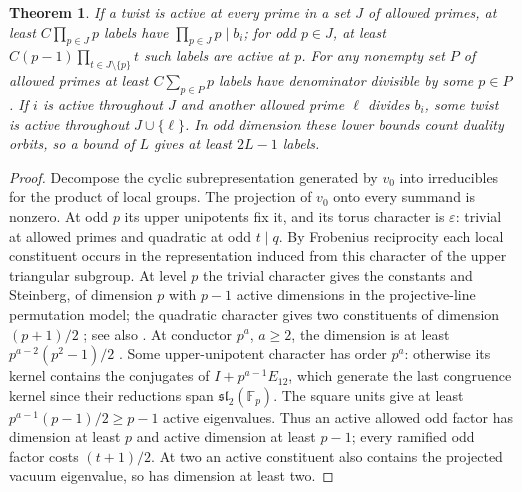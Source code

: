 \documentclass[11pt]{amsart}
\numberwithin{equation}{section}
\newtheorem{theorem}{Theorem}[section]
\theoremstyle{definition}
\theoremstyle{plain}
\begin{document}
\begin{theorem}\label{thm:spherical}
If a twist is active at every prime in a set $J$ of allowed primes,
at least $C\prod_{p\in J}p$ labels have $\prod_{p\in J}p\mid b_i$;
for odd $p\in J$, at least $C(p-1)\prod_{t\in J\setminus\{p\}}t$
such labels are active at $p$.
For any nonempty set $P$ of allowed primes at least $C\sum_{p\in P}p$
labels have denominator divisible by some $p\in P$. If $i$ is active
throughout $J$ and another allowed prime $\ell$ divides $b_i$, some
twist is active throughout $J\cup\{\ell\}$.
In odd dimension these lower bounds count duality orbits, so a
bound of $L$ gives at least $2L-1$ labels.
\end{theorem}
\begin{proof}
Decompose the cyclic subrepresentation generated by $v_0$ into
irreducibles for the product of local groups. The projection of $v_0$
onto every summand is nonzero. At odd $p$ its upper unipotents fix it,
and its torus character is $\varepsilon$: trivial at allowed primes
and quadratic at odd $t\mid q$. By Frobenius reciprocity each local
constituent occurs in the representation induced from this character
of the upper triangular subgroup. At level $p$ the trivial character
gives the constants and Steinberg, of dimension $p$ with $p-1$
active dimensions in the projective-line permutation model;
the quadratic character gives two constituents of dimension $(p+1)/2$
\cite[Lemma~4.3]{Nevins}; see also \cite[\S2.5]{PrasadSL}.
At conductor $p^a$, $a\ge2$, the dimension is at least
$p^{a-2}(p^2-1)/2$ \cite[Lemmas~4.2--4.3 and Proposition~4.4]{Nevins}.
Some upper-unipotent character has order $p^a$: otherwise its kernel
contains the conjugates of $I+p^{a-1}E_{12}$, which generate the last
congruence kernel since their reductions span
$\mathfrak{sl}_2(\mathbb F_p)$. The square units give at least
$p^{a-1}(p-1)/2\ge p-1$ active eigenvalues. Thus an active allowed
odd factor has dimension at least $p$ and active dimension at least
$p-1$; every ramified odd factor costs $(t+1)/2$. At two an active
constituent also contains the projected vacuum eigenvalue, so has
dimension at least two.


\end{proof}
\end{document}
